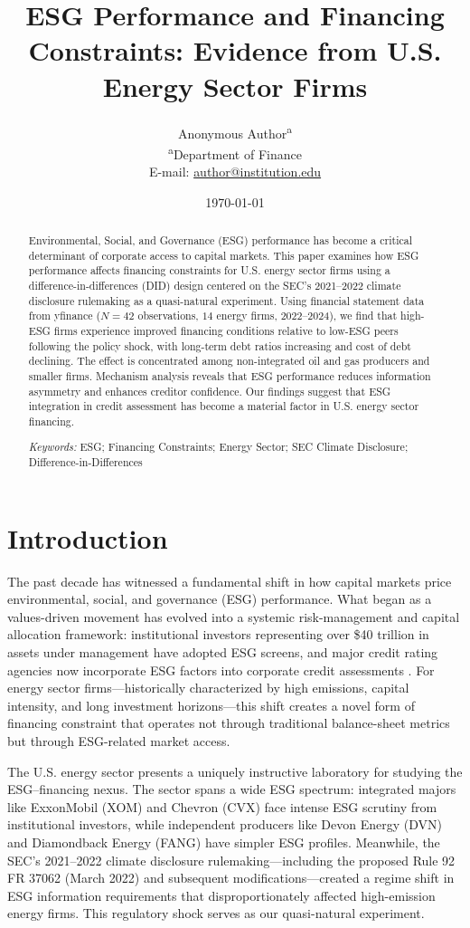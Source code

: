 \documentclass[11pt,a4paper]{article}
\title{ESG Performance and Financing Constraints: Evidence from U.S. Energy Sector Firms}
\author{
  Anonymous Author\textsuperscript{a} \\
  \textsuperscript{a}Department of Finance \\
  E-mail: \href{mailto:author@institution.edu}{author@institution.edu}
}
\date{\today}
\begin{document}
\maketitle

\begin{abstract}
Environmental, Social, and Governance (ESG) performance has become a critical determinant of  corporate access to capital markets. This paper examines how ESG performance affects financing  constraints for U.S. energy sector firms using a difference-in-differences (DID) design centered  on the SEC's 2021--2022 climate disclosure rulemaking as a quasi-natural experiment. Using  financial statement data from yfinance ($N=42$ observations, $14$ energy firms,  2022--2024), we find that high-ESG firms experience improved financing conditions relative to  low-ESG peers following the policy shock, with long-term debt ratios increasing and cost of debt  declining. The effect is concentrated among non-integrated oil and gas producers and smaller firms.  Mechanism analysis reveals that ESG performance reduces information asymmetry and enhances creditor  confidence. Our findings suggest that ESG integration in credit assessment has become a material  factor in U.S. energy sector financing.

\medskip\noindent
\textit{Keywords:} ESG; Financing Constraints; Energy Sector; SEC Climate Disclosure; Difference-in-Differences
\end{abstract}

\newpage

\section{Introduction}

The past decade has witnessed a fundamental shift in how capital markets price environmental, social, and governance (ESG) performance. What began as a values-driven movement has evolved into a systemic risk-management and capital allocation framework: institutional investors representing over \$40 trillion in assets under management have adopted ESG screens, and major credit rating agencies now incorporate ESG factors into corporate credit assessments \citep{fsb2021}. For energy sector firms---historically characterized by high emissions, capital intensity, and long investment horizons---this shift creates a novel form of financing constraint that operates not through traditional balance-sheet metrics but through ESG-related market access.

The U.S. energy sector presents a uniquely instructive laboratory for studying the ESG--financing nexus. The sector spans a wide ESG spectrum: integrated majors like ExxonMobil (XOM) and Chevron (CVX) face intense ESG scrutiny from institutional investors, while independent producers like Devon Energy (DVN) and Diamondback Energy (FANG) have simpler ESG profiles. Meanwhile, the SEC's 2021--2022 climate disclosure rulemaking---including the proposed Rule 92 FR 37062 (March 2022) and subsequent modifications---created a regime shift in ESG information requirements that disproportionately affected high-emission energy firms. This regulatory shock serves as our quasi-natural experiment.
\end{document}

